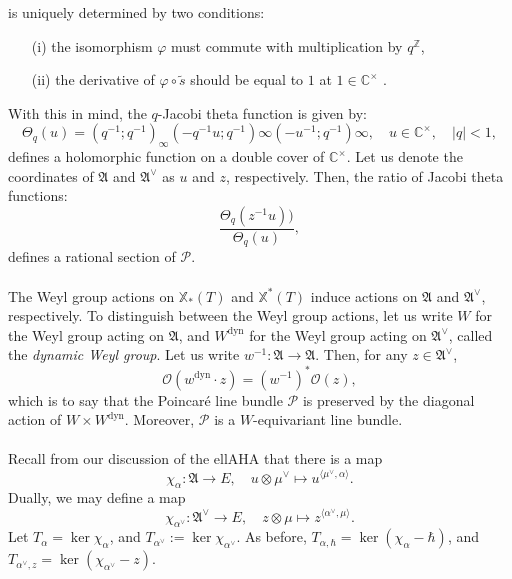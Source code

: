 \documentclass[a4paper]{report}
\theoremstyle{theorem}
\theoremstyle{definition}
\theoremstyle{remark}
\theoremstyle{proposition}
\theoremstyle{conjecture}
\theoremstyle{lemma}
\theoremstyle{corollary}
\theoremstyle{exercise}
\theoremstyle{example}
\newcommand{\C}{\mathbb{C}}
\newcommand{\mcal}{\mathcal}
\newcommand{\on}{\operatorname}
\newcommand{\dyn}{{\on{dyn}}}
\begin{document}
  is uniquely determined by two conditions:
  \begin{itemize}
      \item[(i)] the isomorphism $\varphi$ must commute with multiplication by $q^{\mathbb{Z}}$,
      \item[(ii)] the derivative of $\varphi \circ \widetilde{s}$ should be equal to $1$ at $1 \in \C^\times$ 
      \cite[pg. 38]{sie80}.
  \end{itemize}
  With this in mind, the $q$-Jacobi theta function is given by:
  $$\Theta_q(u) = (q^{-1};q^{-1})_\infty (-q^{-1}u;q^{-1})\infty (-u^{-1};q^{-1})\infty,\quad u \in \C^\times,\quad \vert q \vert < 1,$$
  defines a holomorphic function on a double cover of $\C^\times$. Let us denote the coordinates of 
  $\mathfrak{A}$ and $\mathfrak{A}^\vee$ as $u$ and $z$, respectively. Then, the ratio of Jacobi theta functions:
  $$\frac{\Theta_q(z^{-1}u))}{\Theta_q(u)},$$ defines a rational section of $\mcal{P}$.\\\\
  The Weyl group actions on $\mathbb{X}_\ast(T)$ and $\mathbb{X}^\ast(T)$
  induce actions on $\mathfrak{A}$ and $\mathfrak{A}^\vee$, respectively.
  To distinguish between the Weyl group actions, let us write $W$ for the 
  Weyl group acting on $\mathfrak{A}$, and $W^{\on{dyn}}$ for the Weyl group
  acting on $\mathfrak{A}^\vee$, called the \emph{dynamic Weyl group}. 
  Let us write $w^{-1} : \mathfrak{A} \to \mathfrak{A}$. Then, 
  for any $z\in \mathfrak{A}^\vee$, 
  $$\mcal{O}(w^\dyn \cdot z) = (w^{-1})^\ast \mcal{O}(z),$$
  which is to say that the Poincar\'e line bundle $\mcal{P}$ is preserved by the
  diagonal action of $W\times W^\dyn$. Moreover, $\mcal{P}$ is a $W$-equivariant 
  line bundle.\\\\
  Recall from our discussion of the ellAHA that there is a map 
  $$\chi_\alpha : \mathfrak{A} \longrightarrow E,\quad u \otimes \mu^\vee \longmapsto u^{\langle \mu^\vee, \alpha\rangle}.$$
  Dually, we may define a map 
  $$\chi_{\alpha^\vee} : \mathfrak{A}^\vee \longrightarrow E,\quad z \otimes \mu \longmapsto z^{\langle \alpha^\vee, \mu\rangle}.$$
  Let $T_\alpha = \ker \chi_\alpha$, and $T_{\alpha^\vee} := \ker \chi_{\alpha^\vee}$. As before, 
  $T_{\alpha,\hbar} = \ker (\chi_\alpha - \hbar)$, and $T_{\alpha^\vee, z} = \ker (\chi_{\alpha^\vee} - z)$.
  
\end{document}
